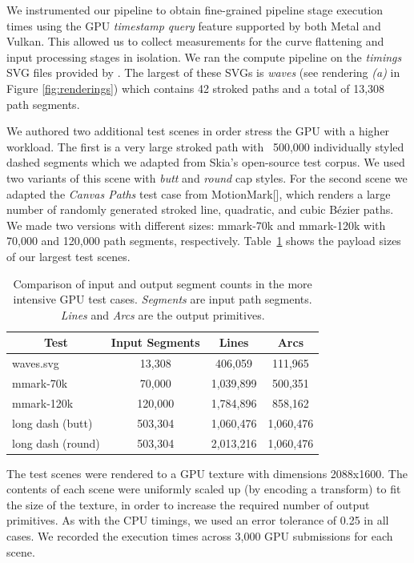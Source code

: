 \documentclass[sigconf]{acmart}
\begin{document}
We instrumented our pipeline to obtain fine-grained pipeline stage execution times using the GPU \emph{timestamp query} feature supported by both Metal and Vulkan. This allowed us to collect measurements for the curve flattening and input processing stages in isolation. We ran the compute pipeline on the \emph{timings} SVG files provided by \citet{Nehab2020}. The largest of these SVGs is \emph{waves} (see rendering \emph{(a)} in Figure \ref{fig:renderings}) which contains 42 stroked paths and a total of 13,308 path segments.

We authored two additional test scenes in order stress the GPU with a higher workload. The first is a very large stroked path with ~500,000 individually styled dashed segments which we adapted from Skia's open-source test corpus. We used two variants of this scene with \emph{butt} and \emph{round} cap styles. For the second scene we adapted the \emph{Canvas Paths} test case from MotionMark[], which renders a large number of randomly generated stroked line, quadratic, and cubic Bézier paths. We made two versions with different sizes: mmark-70k and mmark-120k with 70,000 and 120,000 path segments, respectively. Table~\ref{table:bump-counts} shows the payload sizes of our largest test scenes.

\begin{table}
    \caption{Comparison of input and output segment counts in the more intensive GPU test cases. \emph{Segments} are input path segments. \emph{Lines} and \emph{Arcs} are the output primitives.}
    \begin{tabular}{|l|c|c|c|}
    \hline
        \multicolumn{1}{|c|}{\textbf{Test}} & \textbf{Input Segments} & \textbf{Lines} & \textbf{Arcs} \\
    \hline
        waves.svg & 13,308 & 406,059 & 111,965 \\
        mmark-70k & 70,000 & 1,039,899 & 500,351 \\
        mmark-120k & 120,000 & 1,784,896 & 858,162 \\
        long dash (butt) & 503,304 & 1,060,476 & 1,060,476 \\
        long dash (round) & 503,304 & 2,013,216 & 1,060,476 \\
    \hline
    \end{tabular}
    \label{table:bump-counts}
\end{table}

The test scenes were rendered to a GPU texture with dimensions 2088x1600. The contents of each scene were uniformly scaled up (by encoding a transform) to fit the size of the texture, in order to increase the required number of output primitives. As with the CPU timings, we used an error tolerance of 0.25 in all cases. We recorded the execution times across 3,000 GPU submissions for each scene.
\end{document}
